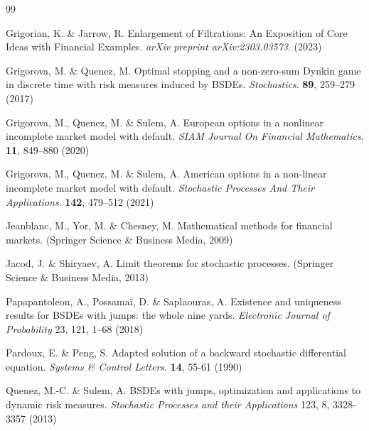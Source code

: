 \documentclass[11pt,a4paper]{article}
\numberwithin{equation}{section}
\theoremstyle{newPlain}
\theoremstyle{newDefinition}
\theoremstyle{newRemark}
\begin{document}
\begin{thebibliography}{99}

Grigorian, K. \& Jarrow, R. Enlargement of Filtrations: An Exposition of Core Ideas with Financial Examples. {\em arXiv preprint arXiv:2303.03573}. (2023)

Grigorova, M. \& Quenez, M. Optimal stopping and a non-zero-sum Dynkin game in discrete time with risk measures induced by BSDEs. {\em Stochastics}. \textbf{89}, 259–279 (2017)


Grigorova, M., Quenez, M. \& Sulem, A. European options in a nonlinear incomplete market model with default. {\em SIAM Journal On Financial Mathematics}. \textbf{11}, 849–880 (2020)

Grigorova, M., Quenez, M. \& Sulem, A. American options in a non-linear incomplete market model with default. {\em Stochastic Processes And Their Applications}. \textbf{142}, 479–512 (2021)

Jeanblanc, M., Yor, M. \& Chesney, M. Mathematical methods for financial markets. (Springer Science \& Business Media, 2009)


Jacod, J. \& Shiryaev, A. Limit theorems for stochastic processes. (Springer Science \& Business Media, 2013)


Papapantoleon, A., Possama\"i, D. \& Saplaouras, A. Existence and uniqueness results for BSDEs with jumps: the whole nine yards. \textit{Electronic Journal of Probability} 23, 121, 1–68 (2018)




Pardoux, E. \& Peng, S. Adapted solution of a backward stochastic differential equation. {\em Systems \& Control Letters}. \textbf{14}, 55-61 (1990)



Quenez, M.-C. \& Sulem, A.
BSDEs with jumps, optimization and applications to dynamic risk measures.
\textit{Stochastic Processes and their Applications}
123, 8, 3328-3357 (2013)


\end{thebibliography}
\end{document}
